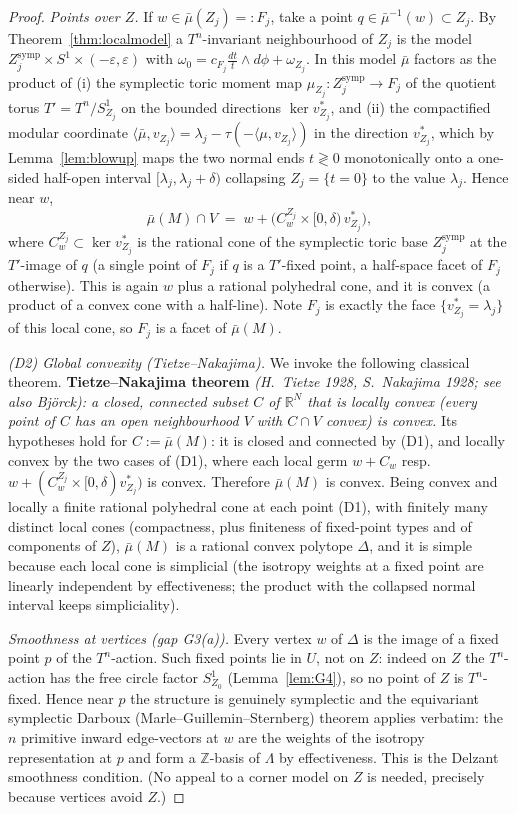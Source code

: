 \documentclass{amsart}
\theoremstyle{definition}
\begin{document}
\begin{proof}
\emph{Points over $Z$.} If $w\in\bar\mu(Z_j)=:F_j$, take a point $q\in
\bar\mu^{-1}(w)\subset Z_j$. By Theorem~\ref{thm:localmodel} a $T^n$-invariant
neighbourhood of $Z_j$ is the model $Z_j^{\mathrm{symp}}\times S^1\times
(-\varepsilon,\varepsilon)$ with $\omega_0=c_{F_j}\tfrac{dt}{t}\wedge d\phi+
\omega_{Z_j}$. In this model $\bar\mu$ factors as the product of (i) the
symplectic toric moment map $\mu_{Z_j}\colon Z_j^{\mathrm{symp}}\to F_j$ of the
quotient torus $T'=T^n/S^1_{Z_j}$ on the bounded directions $\ker v^*_{Z_j}$,
and (ii) the compactified modular coordinate
$\langle\bar\mu,v_{Z_j}\rangle=\lambda_j-\tau(-\langle\mu,v_{Z_j}\rangle)$ in the
direction $v^*_{Z_j}$, which by Lemma~\ref{lem:blowup} maps the two normal ends
$t\gtrless0$ monotonically onto a one-sided half-open interval $[\lambda_j,
\lambda_j+\delta)$ collapsing $Z_j=\{t=0\}$ to the value $\lambda_j$. Hence near
$w$,
\[
\bar\mu(M)\cap V \;=\; w+\bigl(C_w^{Z_j}\times[0,\delta)\,v^*_{Z_j}\bigr),
\]
where $C_w^{Z_j}\subset\ker v^*_{Z_j}$ is the rational cone of the symplectic
toric base $Z_j^{\mathrm{symp}}$ at the $T'$-image of $q$ (a single point of
$F_j$ if $q$ is a $T'$-fixed point, a half-space facet of $F_j$ otherwise). This
is again $w$ plus a rational polyhedral cone, and it is convex (a product of a
convex cone with a half-line). Note $F_j$ is exactly the face $\{v^*_{Z_j}=
\lambda_j\}$ of this local cone, so $F_j$ is a facet of $\bar\mu(M)$.

\emph{(D2) Global convexity (Tietze--Nakajima).} We invoke the following
classical theorem. \textbf{Tietze--Nakajima theorem} \emph{(H.\ Tietze 1928,
S.\ Nakajima 1928; see also Bj\"orck): a closed, connected subset $C$ of
$\mathbb R^N$ that is \emph{locally convex} (every point of $C$ has an open
neighbourhood $V$ with $C\cap V$ convex) is convex.} Its hypotheses hold for
$C:=\bar\mu(M)$: it is closed and connected by (D1), and locally convex by the
two cases of (D1), where each local germ $w+C_w$ resp.\ $w+(C_w^{Z_j}\times
[0,\delta)v^*_{Z_j})$ is convex. Therefore $\bar\mu(M)$ is convex. Being convex
and locally a finite rational polyhedral cone at each point (D1), with finitely
many distinct local cones (compactness, plus finiteness of fixed-point types and
of components of $Z$), $\bar\mu(M)$ is a rational convex polytope $\Delta$, and
it is simple because each local cone is simplicial (the isotropy weights at a
fixed point are linearly independent by effectiveness; the product with the
collapsed normal interval keeps simpliciality).

\emph{Smoothness at vertices (gap G3(a)).} Every vertex $w$ of $\Delta$ is the
image of a fixed point $p$ of the $T^n$-action. Such fixed points lie in $U$,
not on $Z$: indeed on $Z$ the $T^n$-action has the free circle factor
$S^1_{Z_0}$ (Lemma~\ref{lem:G4}), so no point of $Z$ is $T^n$-fixed. Hence near
$p$ the structure is genuinely symplectic and the equivariant symplectic Darboux
(Marle--Guillemin--Sternberg) theorem applies verbatim: the $n$ primitive inward
edge-vectors at $w$ are the weights of the isotropy representation at $p$ and
form a $\mathbb Z$-basis of $\Lambda$ by effectiveness. This is the Delzant
smoothness condition. (No appeal to a corner model on $Z$ is needed, precisely
because vertices avoid $Z$.)


\end{proof}
\end{document}
